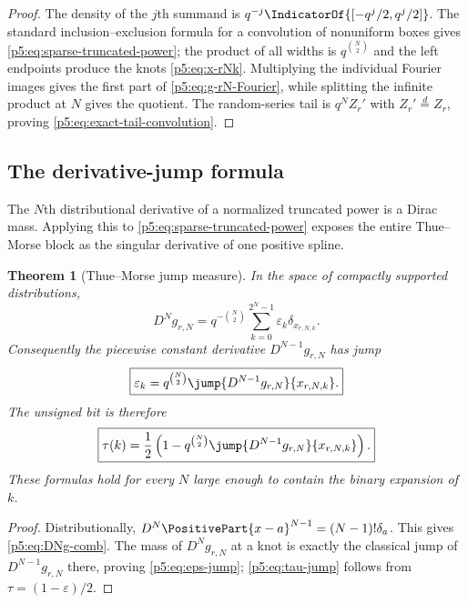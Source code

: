 \documentclass[11pt]{article}
\newtheorem{theorem}{Theorem}[section]
\theoremstyle{definition}
\theoremstyle{remark}
\newcommand{\eps}{\varepsilon}
\begin{document}
\begin{proof}
The density of the $j$th summand is
$q^{-j}\IndicatorOf{[-q^j/2,q^j/2]}$.  The standard inclusion--exclusion formula
for a convolution of nonuniform boxes gives
\eqref{p5:eq:sparse-truncated-power}; the product of all widths is
$q^{\binom N2}$ and the left endpoints produce the knots
\eqref{p5:eq:x-rNk}.  Multiplying the individual Fourier images gives the first
part of \eqref{p5:eq:g-rN-Fourier}, while splitting the infinite product at $N$
gives the quotient.  The random-series tail is
$q^NZ_r'$ with $Z_r'\overset d=Z_r$, proving
\eqref{p5:eq:exact-tail-convolution}.
\end{proof}

\subsection{The derivative-jump formula}

The $N$th distributional derivative of a normalized truncated power is a
Dirac mass.  Applying this to \eqref{p5:eq:sparse-truncated-power} exposes the
entire Thue--Morse block as the singular derivative of one positive spline.

\begin{theorem}[Thue--Morse jump measure]
\label{p5:thm:TM-jump-measure}
In the space of compactly supported distributions,
\begin{equation}
 \boxed{\displaystyle
 D^Ng_{r,N}=q^{-\binom N2}
   \sum_{k=0}^{2^N-1}\eps_k\delta_{x_{r,N,k}}.}            \label{p5:eq:DNg-comb}
\end{equation}
Consequently the piecewise constant derivative $D^{N-1}g_{r,N}$ has jump
\begin{equation}
 \boxed{\displaystyle
 \eps_k=q^{\binom N2}
 \jump{D^{N-1}g_{r,N}}{x_{r,N,k}}.}                       \label{p5:eq:eps-jump}
\end{equation}
The unsigned bit is therefore
\begin{equation}
 \boxed{\displaystyle
 \tau(k)=\frac12\left(1-q^{\binom N2}
 \jump{D^{N-1}g_{r,N}}{x_{r,N,k}}\right).}                \label{p5:eq:tau-jump}
\end{equation}
These formulas hold for every $N$ large enough to contain the binary expansion
of $k$.
\end{theorem}

\begin{proof}
Distributionally,
$D^N\PositivePart{x-a}^{N-1}=(N-1)!\delta_a$.
This gives \eqref{p5:eq:DNg-comb}.  The mass of $D^Ng_{r,N}$ at a knot is exactly
the classical jump of $D^{N-1}g_{r,N}$ there, proving
\eqref{p5:eq:eps-jump}; \eqref{p5:eq:tau-jump} follows from
$\tau=(1-\eps)/2$.
\end{proof}
\end{document}

